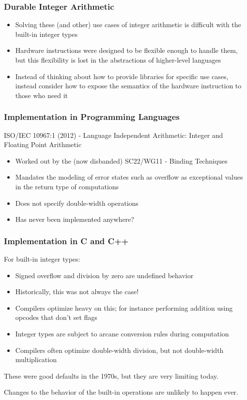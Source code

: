 \documentclass[aspectratio=169]{beamer}
\newif\iftransitions
\begin{document}
\begin{frame}
  \frametitle{Durable Integer Arithmetic}
  
  \begin{itemize}
  \item Solving these (and other) use cases of integer arithmetic is difficult with the built-in integer types  \iftransitions \pause \fi 
  \item Hardware instructions were designed to be flexible enough to handle them, but this flexibility is lost in the abstractions of higher-level languages  \iftransitions \pause \fi 
  \item Instead of thinking about how to provide libraries for specific use cases, instead consider how to expose the semantics of the hardware instruction to those who need it
  \end{itemize}
\end{frame}

\begin{frame}
  \frametitle{Implementation in Programming Languages}
  
  ISO/IEC 10967:1 (2012) - Language Independent Arithmetic: Integer and Floating Point Arithmetic
  
  \begin{itemize}
  \item Worked out by the (now disbanded) SC22/WG11 - Binding Techniques  \iftransitions \pause \fi 
  \item Mandates the modeling of error states such as overflow as exceptional values in the return type of computations  \iftransitions \pause \fi 
  \item Does not specify double-width operations  \iftransitions \pause \fi 
  \item Has never been implemented anywhere?
  \end{itemize}
\end{frame}

\begin{frame}
  \frametitle{Implementation in C and C++}
  
  For built-in integer types:
  \begin{itemize}
  \item Signed overflow and division by zero are undefined behavior  \iftransitions \pause \fi 
  \item Historically, this was not always the case! \iftransitions \pause \fi 
  \item Compilers optimize heavy on this; for instance performing addition using opcodes that don't set flags  \iftransitions \pause \fi 
  \item Integer types are subject to arcane conversion rules during computation  \iftransitions \pause \fi 
  \item Compilers often optimize double-width division, but not double-width multiplication \iftransitions \pause \fi 
  \end{itemize}
  
  These were good defaults in the 1970s, but they are very limiting today.
  
  Changes to the behavior of the built-in operations are unlikely to happen ever.
\end{frame}
\end{document}
